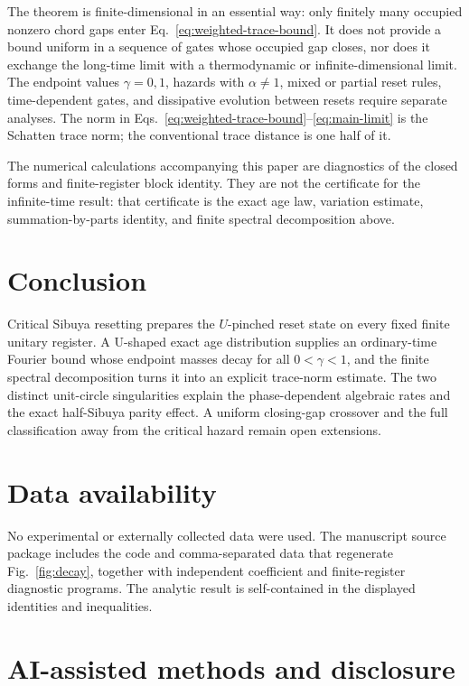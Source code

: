 \documentclass[aps,pra,reprint,superscriptaddress,longbibliography,nofootinbib]{revtex4-2}
\begin{document}
The theorem is finite-dimensional in an essential way: only finitely many
occupied nonzero chord gaps enter Eq.~\eqref{eq:weighted-trace-bound}.  It does
not provide a bound uniform in a sequence of gates whose occupied gap closes,
nor does it exchange the long-time limit with a thermodynamic or
infinite-dimensional limit.  The endpoint values $\gamma=0,1$, hazards with
$\alpha\ne1$, mixed or partial reset rules, time-dependent gates, and
dissipative evolution between resets require separate analyses.  The norm in
Eqs.~\eqref{eq:weighted-trace-bound}--\eqref{eq:main-limit} is the Schatten
trace norm; the conventional trace distance is one half of it.

The numerical calculations accompanying this paper are diagnostics of the
closed forms and finite-register block identity.  They are not the certificate
for the infinite-time result: that certificate is the exact age law,
variation estimate, summation-by-parts identity, and finite spectral
decomposition above.

\section{Conclusion}

Critical Sibuya resetting prepares the $U$-pinched reset state on every fixed
finite unitary register.  A U-shaped exact age distribution supplies an
ordinary-time Fourier bound whose endpoint masses decay for all
$0<\gamma<1$, and the finite spectral decomposition turns it into an explicit
trace-norm estimate.  The two distinct unit-circle singularities explain the
phase-dependent algebraic rates and the exact half-Sibuya parity effect.  A
uniform closing-gap crossover and the full classification away from the
critical hazard remain open extensions.

\section*{Data availability}

No experimental or externally collected data were used.  The manuscript
source package includes the code and comma-separated data that regenerate
Fig.~\ref{fig:decay}, together with independent coefficient and finite-register
diagnostic programs.  The analytic result is self-contained in the displayed
identities and inequalities.

\section*{AI-assisted methods and disclosure}
\end{document}

